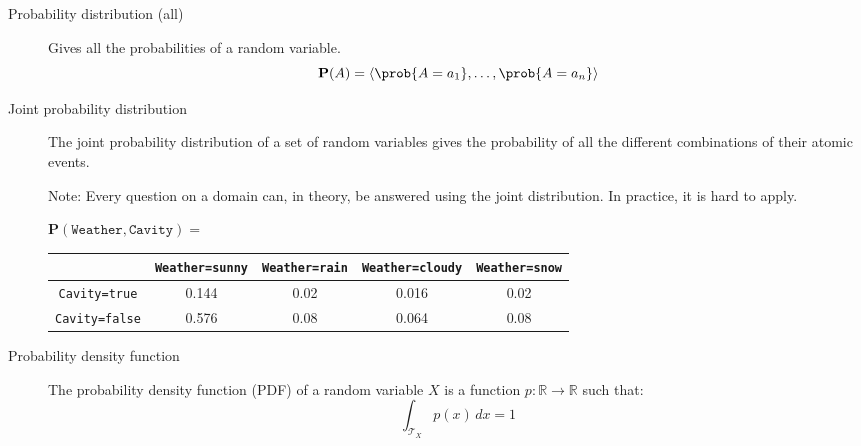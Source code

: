 \begin{description}
    \item[Probability distribution (all)] 
        Gives all the probabilities of a random variable.
        \[ \textbf{P}(A) = \langle \prob{A=a_1}, \dots, \prob{A=a_n} \rangle \]
    
    \item[Joint probability distribution] 
        The joint probability distribution of a set of random variables gives 
        the probability of all the different combinations of their atomic events.

        Note: Every question on a domain can, in theory, be answered using the joint distribution.
        In practice, it is hard to apply.

        \begin{example}
            $\textbf{P}(\texttt{Weather}, \texttt{Cavity}) = $
            \begin{center}
                \small
                \begin{tabular}{|c | c|c|c|c|}
                    \cline{2-5}
                    \multicolumn{1}{c|}{}    & \texttt{Weather=sunny} & \texttt{Weather=rain} & \texttt{Weather=cloudy} & \texttt{Weather=snow} \\
                    \hline
                    \texttt{Cavity=true}    & 0.144 & 0.02 & 0.016 & 0.02 \\
                    \hline
                    \texttt{Cavity=false}   & 0.576 & 0.08 & 0.064 & 0.08 \\
                    \hline
                \end{tabular}
            \end{center}
        \end{example}

    \item[Probability density function] 
        The probability density function (PDF) of a random variable $X$ is a function $p: \mathbb{R} \rightarrow \mathbb{R}$
        such that:
        \[ \int_{\mathcal{T}_X} p(x) \,dx = 1 \]
\end{description}
